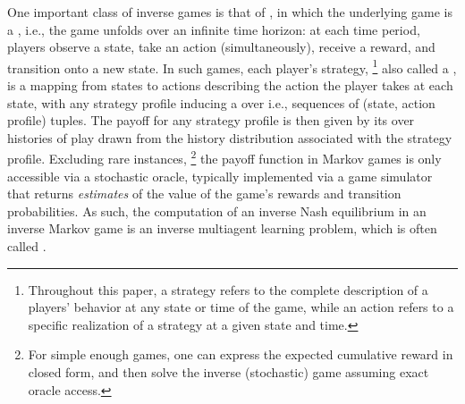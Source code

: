One important class of inverse games is that of , in which the underlying game is a  \citep{shapley1953stochastic, fink1964equilibrium, takahashi1964equilibrium}, i.e., the game 
unfolds over an infinite time horizon: at each time period, players observe a state, take an action (simultaneously), receive a reward, and transition onto a new state. 
In such games, each player's strategy,%
\footnote{Throughout this paper, a strategy refers to the complete description of a players' behavior at any state or time of the game, while an action refers to a specific realization of a strategy at a given state and time.} 
also called a , is a mapping from states to actions describing the action the player takes at each state, with any strategy profile inducing a  over  i.e., sequences of (state, action profile) tuples. 
The payoff for any strategy profile is then given by its  over histories of play drawn from the history distribution associated with the strategy profile. 
Excluding rare instances,%
\footnote{For simple enough games, one can express the expected cumulative reward in closed form, and then solve the inverse (stochastic) game  assuming exact oracle access.}
the payoff function in Markov games is only accessible via a stochastic oracle, typically implemented via a game simulator that returns \emph{estimates} of the value of the game's rewards and transition probabilities.
As such, the computation of an inverse Nash equilibrium in an inverse Markov game is an inverse multiagent learning problem, which is often called  \citep{natarajan2010multi}.







